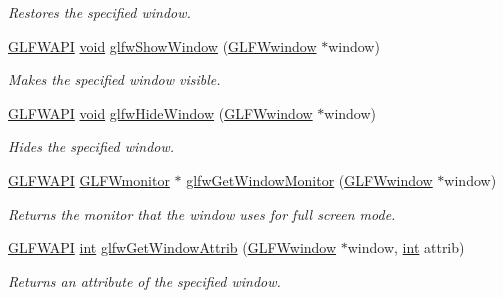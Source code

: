 \begin{DoxyCompactItemize}
\begin{DoxyCompactList}\small\item\em Restores the specified window. \end{DoxyCompactList}\item 
\hyperlink{glfw3_8h_a56da5036b2cc259351ae22fd6439bb47}{G\+L\+F\+W\+A\+P\+I} \hyperlink{wglew_8h_aeea6e3dfae3acf232096f57d2d57f084}{void} \hyperlink{group__window_ga7945bcdff9e5e058cf36505d6873ed8c}{glfw\+Show\+Window} (\hyperlink{group__window_ga3c96d80d363e67d13a41b5d1821f3242}{G\+L\+F\+Wwindow} $\ast$window)
\begin{DoxyCompactList}\small\item\em Makes the specified window visible. \end{DoxyCompactList}\item 
\hyperlink{glfw3_8h_a56da5036b2cc259351ae22fd6439bb47}{G\+L\+F\+W\+A\+P\+I} \hyperlink{wglew_8h_aeea6e3dfae3acf232096f57d2d57f084}{void} \hyperlink{group__window_gaa17e287d521544bdeceafa09ac036e20}{glfw\+Hide\+Window} (\hyperlink{group__window_ga3c96d80d363e67d13a41b5d1821f3242}{G\+L\+F\+Wwindow} $\ast$window)
\begin{DoxyCompactList}\small\item\em Hides the specified window. \end{DoxyCompactList}\item 
\hyperlink{glfw3_8h_a56da5036b2cc259351ae22fd6439bb47}{G\+L\+F\+W\+A\+P\+I} \hyperlink{group__monitor_ga8d9efd1cde9426692c73fe40437d0ae3}{G\+L\+F\+Wmonitor} $\ast$ \hyperlink{group__window_gaf1525cb3bccd5789c702cc9676ef3403}{glfw\+Get\+Window\+Monitor} (\hyperlink{group__window_ga3c96d80d363e67d13a41b5d1821f3242}{G\+L\+F\+Wwindow} $\ast$window)
\begin{DoxyCompactList}\small\item\em Returns the monitor that the window uses for full screen mode. \end{DoxyCompactList}\item 
\hyperlink{glfw3_8h_a56da5036b2cc259351ae22fd6439bb47}{G\+L\+F\+W\+A\+P\+I} \hyperlink{wglew_8h_a500a82aecba06f4550f6849b8099ca21}{int} \hyperlink{group__window_ga1bb0c7e100418e284dbb800789c63d40}{glfw\+Get\+Window\+Attrib} (\hyperlink{group__window_ga3c96d80d363e67d13a41b5d1821f3242}{G\+L\+F\+Wwindow} $\ast$window, \hyperlink{wglew_8h_a500a82aecba06f4550f6849b8099ca21}{int} attrib)
\begin{DoxyCompactList}\small\item\em Returns an attribute of the specified window. \end{DoxyCompactList}\item 

\end{DoxyCompactItemize}
